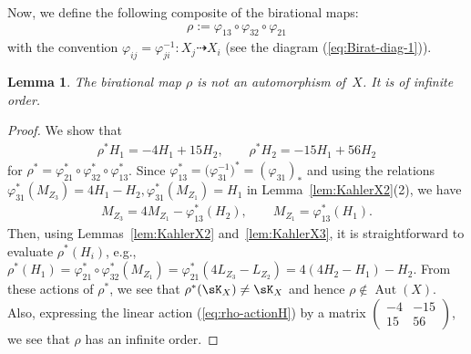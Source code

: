 \documentclass[10pt,a4paper]{amsart}
\numberwithin{equation}{section}
\newtheorem{Lemma}[Theorem]{Lemma}
\begin{document}
Now, we define the following composite of the birational maps:
\begin{gather*}
\rho:=\varphi_{13}\circ\varphi_{32}\circ\varphi_{21}
\end{gather*}
with the convention $\varphi_{ij}=\varphi_{ji}^{-1}\colon X_{j}\dashrightarrow X_{i}$ (see the diagram (\ref{eq:Birat-diag-1})).
\begin{Lemma} The birational map $\rho$ is not an automorphism of~$X$. It is of infinite order.\end{Lemma}
\begin{proof}
We show that
\begin{gather}
\rho^{*}H_{1}=-4H_{1}+15H_{2},\qquad \rho^{*}H_{2}=-15H_{1}+56H_{2} \label{eq:rho-actionH}
\end{gather}
for $\rho^{*}=\varphi_{21}^{*}\circ\varphi_{32}^{*}\circ\varphi_{13}^{*}$. Since $\varphi_{13}^{*}=\big(\varphi_{31}^{-1}\big)^{*}=(\varphi_{31})_{*}$ and using the relations $\varphi_{31}^{*}(M_{Z_{3}})=4H_{1}-H_{2},\varphi_{31}^{*}(M_{Z_{1}})=H_{1}$ in Lemma~\ref{lem:KahlerX2}(2), we have
\begin{gather*}
M_{Z_{3}}=4M_{Z_{1}}-\varphi_{13}^{*}(H_{2}),\qquad M_{Z_{1}}=\varphi_{13}^{*}(H_{1}).
\end{gather*}
Then, using Lemmas~\ref{lem:KahlerX2} and~\ref{lem:KahlerX3}, it is straightforward to evaluate $\rho^{*}(H_{i})$, e.g., $\rho^{*}(H_{1})=\varphi_{21}^{*}\circ\varphi_{32}^{*}(M_{Z_{1}})=\varphi_{21}^{*}(4L_{Z_{3}}-L_{Z_{2}})=4(4H_{2}-H_{1})-H_{2}$. From these actions of $\rho^{*}$, we see that $\rho^{*}(\sK_{X})\not=\sK_{X}$ and hence $\rho\notin\operatorname{Aut}(X).$ Also, expressing the linear
action (\ref{eq:rho-actionH}) by a matrix $\left(\begin{smallmatrix}-4 & -15\\
15 & 56 \end{smallmatrix}\right)$, we see that $\rho$ has an infinite order. \end{proof}
\end{document}
